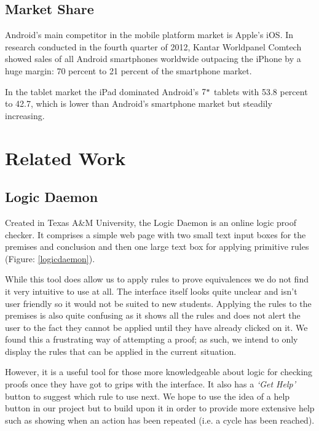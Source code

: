 \documentclass{report}
\begin{document}
\subsection{Market Share}

Android's main competitor in the mobile platform market is Apple's iOS. In research conducted in the fourth quarter of 2012, Kantar Worldpanel Comtech showed sales of all Android smartphones worldwide outpacing the iPhone by a huge margin: 70 percent to 21 percent of the smartphone market\cite{androidstats}.

In the tablet market the iPad dominated Android's $7\verb+"+$ tablets with 53.8 percent to 42.7, which is lower than Android's smartphone market but steadily increasing.

\section{Related Work}

\subsection{Logic Daemon}

Created in Texas A\&M University, the Logic Daemon\cite{logicdaemon} is an online logic proof checker. It comprises a simple web page with two small text input boxes for the premises and conclusion and then one large text box for applying primitive rules (Figure: \ref{logicdaemon}).

While this tool does allow us to apply rules to prove equivalences we do not find it very intuitive to use at all. The interface itself looks quite unclear and isn't user friendly so it would not be suited to new students. Applying the rules to the premises is also quite confusing as it shows all the rules and does not alert the user to the fact they cannot be applied until they have already clicked on it. We found this a frustrating way of attempting a proof; as such, we intend to only display the rules that can be applied in the current situation.

However, it is a useful tool for those more knowledgeable about logic for checking proofs once they have got to grips with the interface. It also has a \textit{`Get Help'} button to suggest which rule to use next. We hope to use the idea of a help button in our project but to build upon it in order to provide more extensive help such as showing when an action has been repeated (i.e. a cycle has been reached).
\end{document}
